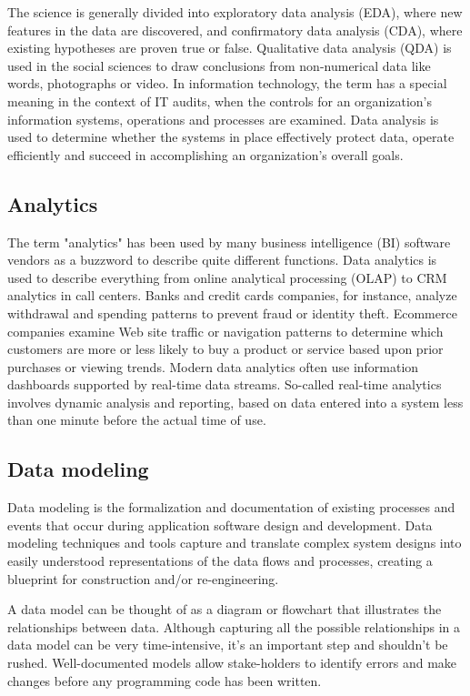\documentclass[]{report}
\begin{document}
The science is generally divided into exploratory data analysis (EDA), where new features in the data are discovered, and confirmatory data analysis (CDA), where existing hypotheses are proven true or false. Qualitative data analysis (QDA) is used in the social sciences to draw conclusions from non-numerical data like words, photographs or video. In information technology, the term has a special meaning in the context of IT audits, when the controls for an organization's information systems, operations and processes are examined. Data analysis is used to determine whether the systems in place effectively protect data, operate efficiently and succeed in accomplishing an organization's overall goals.

    \subsection*{ Analytics }

The term "analytics" has been used by many business intelligence (BI) software vendors as a buzzword to describe quite different functions. Data analytics is used to describe everything from online analytical processing (OLAP) to CRM analytics in call centers. Banks and credit cards companies, for instance, analyze withdrawal and spending patterns to prevent fraud or identity theft. Ecommerce companies examine Web site traffic or navigation patterns to determine which customers are more or less likely to buy a product or service based upon prior purchases or viewing trends. Modern data analytics often use information dashboards supported by real-time data streams. So-called real-time analytics involves dynamic analysis and reporting, based on data entered into a system less than one minute before the actual time of use.

    \subsection*{Data modeling }
Data modeling is the formalization and documentation of existing processes and events that occur during application software design and development. Data modeling techniques and tools capture and translate complex system designs into easily understood representations of the data flows and processes, creating a blueprint for construction and/or re-engineering.

A data model can be thought of as a diagram or flowchart that illustrates the relationships between data. Although capturing all the possible relationships in a data model can be very time-intensive, it's an important step and shouldn't be rushed. Well-documented models allow stake-holders to identify errors and make changes before any programming code has been written.
\end{document}
